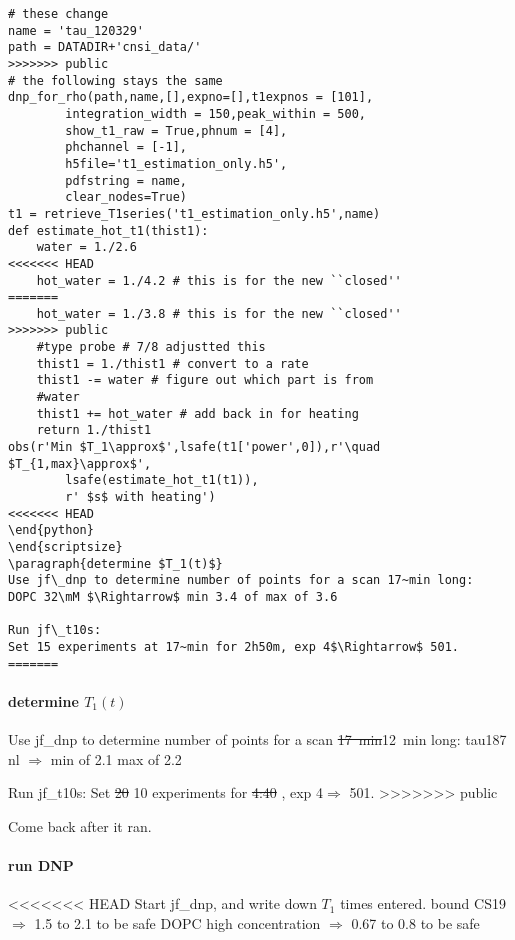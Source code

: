 \begin{scriptsize}
\begin{python}[off]
\begin{scriptsize}
\begin{lstlisting}
# these change
name = 'tau_120329'
path = DATADIR+'cnsi_data/'
>>>>>>> public
# the following stays the same
dnp_for_rho(path,name,[],expno=[],t1expnos = [101],
        integration_width = 150,peak_within = 500,
        show_t1_raw = True,phnum = [4],
        phchannel = [-1],
        h5file='t1_estimation_only.h5',
        pdfstring = name,
        clear_nodes=True)
t1 = retrieve_T1series('t1_estimation_only.h5',name)
def estimate_hot_t1(thist1):
    water = 1./2.6
<<<<<<< HEAD
    hot_water = 1./4.2 # this is for the new ``closed''
=======
    hot_water = 1./3.8 # this is for the new ``closed''
>>>>>>> public
    #type probe # 7/8 adjustted this
    thist1 = 1./thist1 # convert to a rate
    thist1 -= water # figure out which part is from
    #water
    thist1 += hot_water # add back in for heating
    return 1./thist1
obs(r'Min $T_1\approx$',lsafe(t1['power',0]),r'\quad $T_{1,max}\approx$',
        lsafe(estimate_hot_t1(t1)),
        r' $s$ with heating')
<<<<<<< HEAD
\end{python}
\end{scriptsize}
\paragraph{determine $T_1(t)$}
Use jf\_dnp to determine number of points for a scan 17~min long:
DOPC 32\mM $\Rightarrow$ min 3.4 of max of 3.6

Run jf\_t10s:
Set 15 experiments at 17~min for 2h50m, exp 4$\Rightarrow$ 501.
=======
\end{lstlisting}
\end{scriptsize}

\paragraph{determine $T_1(t)$}
Use jf\_dnp to determine number of points for a scan \sout{17~min}12~min long:
tau187 nl $\Rightarrow$ min of 2.1 max of 2.2

Run jf\_t10s:
Set \sout{ 20 }10 experiments for \sout{ 4:40 }, exp 4$\Rightarrow$ 501.
>>>>>>> public

Come back after it ran.

\paragraph{run DNP}
<<<<<<< HEAD
Start jf\_dnp, and write down $T_1$ times entered.
bound CS19 $\Rightarrow$ 1.5 to 2.1 to be safe
DOPC high concentration $\Rightarrow$ 0.67 to 0.8 to be safe


\end{python}
\end{scriptsize}

